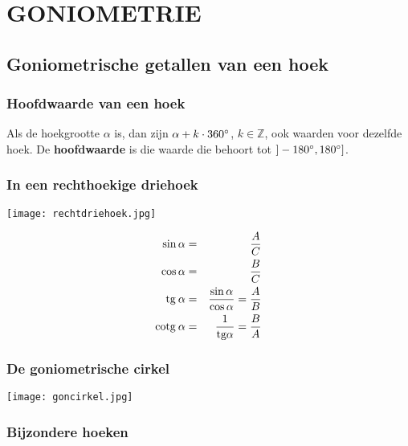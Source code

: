 \section{GONIOMETRIE} \label{goniometrie}
\hypertarget{goniometrie}{}

\subsection{Goniometrische getallen van een hoek} \label{goniometrische_getallen}
\hypertarget{goniometrische_getallen}{}

\subsubsection{Hoofdwaarde van een hoek} \label{hoofdwaarde_hoek}

Als de hoekgrootte $\alpha$ is, dan zijn $\alpha + k\cdot 360^\circ$, $k\in \mathbb{Z}$, ook waarden voor dezelfde hoek. De {\bf hoofdwaarde} is die waarde die behoort tot $]-180^\circ,180^\circ]$.

\subsubsection{In een rechthoekige driehoek} \label{rechthoekige_driehoek}
\hypertarget{rechthoekige_driehoek}{}

\begin{center}
\texttt{[image: rechtdriehoek.jpg]}
\end{center}
\begin{eqnarray*}
\sin\alpha&=&\displaystyle\frac{\displaystyle A}{\displaystyle C}\\
\cos\alpha&=&\displaystyle\frac{\displaystyle B}{\displaystyle C}\\
\mbox{tg}\:\alpha&=&\displaystyle\frac{\displaystyle \sin\alpha}{\displaystyle \cos\alpha}=\displaystyle\frac{\displaystyle A}{\displaystyle B}\\
\mbox{cotg}\:\alpha&=&\displaystyle\frac{\displaystyle 1}{\displaystyle \mbox{tg}\alpha}=\displaystyle\frac{\displaystyle B}{\displaystyle A}
\end{eqnarray*}

\subsubsection{De goniometrische cirkel} \label{goniometrische_cirkel}
\hypertarget{goniometrische_cirkel}{}

\begin{center}
\texttt{[image: goncirkel.jpg]}
\end{center}

\subsubsection{Bijzondere hoeken} \label{bijzondere_hoeken}
\hypertarget{bijzondere_hoeken}{}

